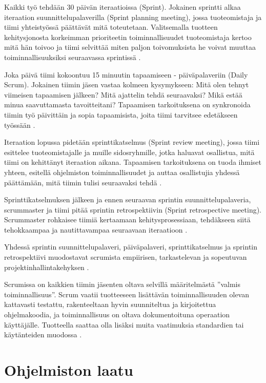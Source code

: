 \documentclass[finnish]{tktltiki2}
\theoremstyle{definition}
\theoremstyle{remark}
\begin{document}
Kaikki työ tehdään 30 päivän iteraatioissa (Sprint). Jokainen sprintti alkaa iteraation suunnittelupalaverilla (Sprint planning meeting), jossa tuoteomistaja ja tiimi yhteistyössä päättävät mitä toteutetaan. Valitsemalla tuotteen kehitysjonosta korkeimman prioriteetin toiminnallisuudet tuoteomistaja kertoo mitä hän toivoo ja tiimi selvittää miten paljon toivomuksista he voivat muuttaa toiminnallisuuksiksi seuraavassa sprintissä \cite{SCH09}.

Joka päivä tiimi kokoontuu 15 minuutin tapaamiseen - päiväpalaveriin (Daily Scrum). Jokainen tiimin jäsen vastaa kolmeen kysymykseen: Mitä olen tehnyt viimeisen tapaamisen jälkeen? Mitä ajattelin tehdä seuraavaksi? Mikä estää minua saavuttamasta tavoitteitani? Tapaamisen tarkoituksena on synkronoida tiimin työ päivittäin ja sopia tapaamisista, joita tiimi tarvitsee edetäkseen työssään \cite{SCH09}.

Iteraation lopussa pidetään sprinttikatselmus (Sprint review meeting), jossa tiimi esittelee tuoteomistajalle ja muille sidosryhmille, jotka haluavat osallistua, mitä tiimi on kehittänyt iteraation aikana. Tapaamisen tarkoituksena on tuoda ihmiset yhteen, esitellä ohjelmiston toiminnallisuudet ja auttaa osallistujia yhdessä päättämään, mitä tiimin tulisi seuraavaksi tehdä \cite{SCH09}. 

Sprinttikatselmuksen jälkeen ja ennen seuraavan sprintin suunnittelupalaveria, scrummaster ja tiimi pitää sprintin retrospektiivin (Sprint retrospective meeting). Scrummaster rohkaisee tiimiä kertaamaan kehitysprosessiaan, tehdäkseen siitä tehokkaampaa ja nautittavampaa seuraavaan iteraatioon \cite{SCH09}.

Yhdessä sprintin suunnittelupalaveri, päiväpalaveri, sprinttikatselmus ja sprintin retrospektiivi muodostavat scrumista empiirisen, tarkastelevan ja sopeutuvan projektinhallintakehyksen \cite{SCH09}.

Scrumissa on kaikkien tiimin jäsenten oltava selvillä määritelmästä ''valmis toiminnallisuus''. Scrum vaatii tuotteeseen lisättävän toiminnallisuuden olevan kattavasti testattu, rakenteeltaan hyvin suunniteltua ja kirjoitettua ohjelmakoodia, ja toiminnallisuus on oltava dokumentoituna operaation käyttäjälle. Tuotteella saattaa olla lisäksi muita vaatimuksia standardien tai käytänteiden muodossa \cite{SCH09}.

\section{Ohjelmiston laatu}
\end{document}
